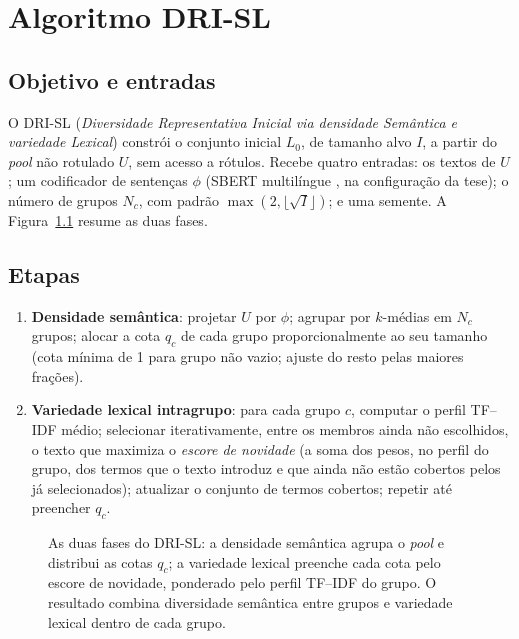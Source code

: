 \chapter{Algoritmo DRI-SL}
\label{ap:drisl}

\section{Objetivo e entradas}

O DRI-SL (\textit{Diversidade Representativa Inicial via densidade
Semântica e variedade Lexical}) constrói o conjunto inicial $L_0$, de
tamanho alvo $I$, a partir do \textit{pool} não rotulado $U$, sem acesso a
rótulos. Recebe quatro entradas: os textos de $U$; um codificador de
sentenças $\phi$ (SBERT multilíngue \citep{Reimers2019SBERT}, na
configuração da tese); o número de grupos $N_c$, com padrão
$\max(2, \lfloor\sqrt{I}\rfloor)$; e uma semente. A
Figura~\ref{fig:ap-drisl-fases} resume as duas fases.

\section{Etapas}

\begin{enumerate}
  \item \textbf{Densidade semântica}: projetar $U$ por $\phi$; agrupar por
  $k$-médias em $N_c$ grupos; alocar a cota $q_c$ de cada grupo
  proporcionalmente ao seu tamanho (cota mínima de 1 para grupo não vazio;
  ajuste do resto pelas maiores frações).
  \item \textbf{Variedade lexical intragrupo}: para cada grupo $c$, computar o
  perfil TF--IDF médio; selecionar iterativamente, entre os membros ainda não
  escolhidos, o texto que maximiza o \emph{escore de novidade} (a soma dos
  pesos, no perfil do grupo, dos termos que o texto introduz e que ainda não
  estão cobertos pelos já selecionados); atualizar o conjunto de termos
  cobertos; repetir até preencher $q_c$.
\end{enumerate}

\begin{figure}[htbp]
    \centering
    
    \caption{As duas fases do DRI-SL: a densidade semântica agrupa o
    \textit{pool} e distribui as cotas $q_c$; a variedade lexical preenche
    cada cota pelo escore de novidade, ponderado pelo perfil TF--IDF do
    grupo. O resultado combina diversidade semântica entre grupos e
    variedade lexical dentro de cada grupo.}
    \label{fig:ap-drisl-fases}
\end{figure}

